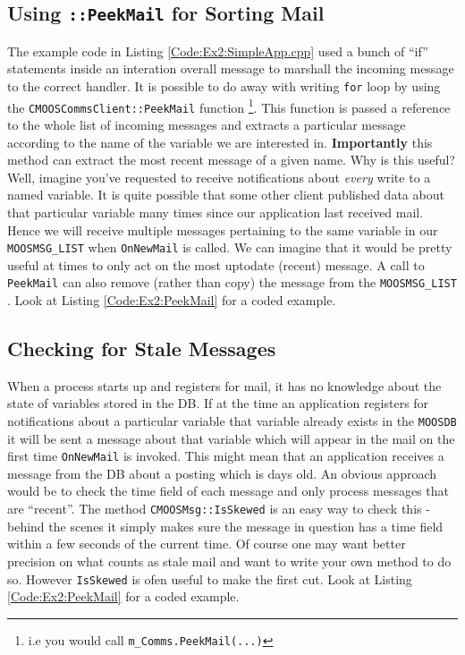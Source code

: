 \documentclass[a4paper,10pt]{article}
\newcommand{\Code}[1]{\texttt{#1} }
\newcommand{\code}[1]{\Code{#1} }
\begin{document}
\subsection{Using \code{::PeekMail} for Sorting Mail}
The example code in Listing \ref{Code:Ex2:SimpleApp.cpp} used a bunch of ``if'' statements inside an interation overall message to marshall the incoming message to the correct handler. It is possible to do away with writing  \code{for} loop by using the
\code{CMOOSCommsClient::PeekMail} function \footnote{i.e you would call \code{m\_Comms.PeekMail(...)}}. This function is passed a reference to the whole list of incoming messages and extracts a particular message according to the name of the variable we are interested in. \textbf{Importantly} this method can extract the most recent message of a given name. Why is this useful? Well, imagine you've requested to receive notifications about \textit{every} write to a named variable. It is quite possible that some other client published data about that particular variable many times since our application last received mail. Hence we will receive multiple messages pertaining to the same variable in our \code{MOOSMSG\_LIST} when \code{OnNewMail} is called. We can imagine that it would be pretty useful at times to only act on the most uptodate (recent) message. A call to \code{PeekMail} can also remove (rather than copy) the message from the \code{MOOSMSG\_LIST}. Look at Listing \ref{Code:Ex2:PeekMail} for a coded example.

\subsection{Checking for Stale Messages}
When a process starts up and registers for mail, it has no knowledge about the state of variables stored in the DB. If at the time an application registers for notifications about a particular variable that variable already exists in the \code{MOOSDB} it will be sent a message about that variable which will appear in the mail on the first time \code{OnNewMail} is invoked. This might mean that an application receives a message from the DB about a posting which is days old. An obvious approach  would be to check the time field of each message and only process messages that are ``recent''. The method \code{CMOOSMsg::IsSkewed} is an easy way to check this - behind the scenes it simply makes sure the message in question has a time field within a few seconds of the current time. Of course one may want better precision on what counts as stale mail and want to write your own method to do so. However \code{IsSkewed} is ofen useful to make the first cut. Look at Listing \ref{Code:Ex2:PeekMail} for a coded example.
\end{document}
